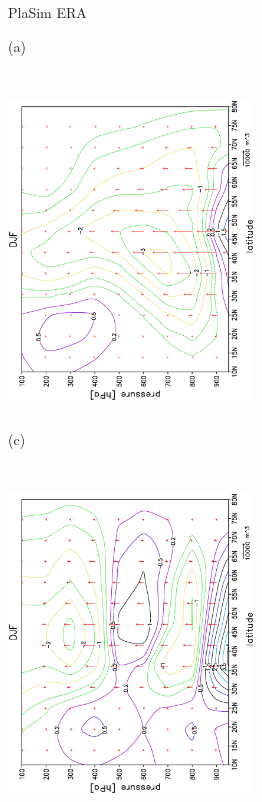 \documentclass[12pt,a4paper,twoside,openright,headinclude,liststotoc,bibtotoc]{scrreprt}
\begin{document}
\begin{figure}[c]
\hspace{4.0cm}PlaSim \vspace{0.2cm} \hspace{7.3cm} ERA \\
\parbox{8.5cm}{\hspace{0.90cm}\begin{scriptsize}(a)\end{scriptsize} \vspace{-0.5cm} \\
\includegraphics[height=8.5cm,width=6.5cm,angle=-90]
{eps/epdjf.eps}
}
\parbox{8.5cm}{\hspace{0.90cm}\begin{scriptsize}(c)\end{scriptsize} \vspace{-0.5cm} \\
\includegraphics[height=8.5cm,width=6.5cm,angle=-90]
{eps/epdjf_era40.eps}
}
\end{figure}
\end{document}
